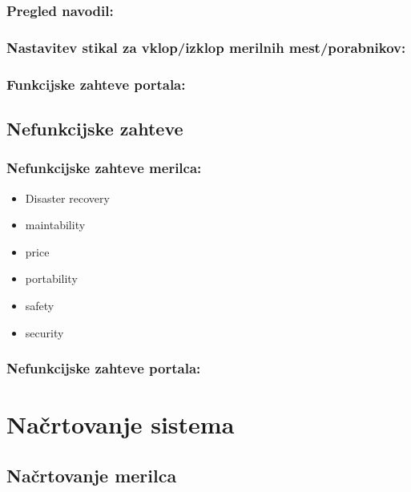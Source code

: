 \documentclass[12pt,a4paper,titlepage,openany]{report}
\begin{document}
\subsection{Pregled navodil:}

\subsection{Nastavitev stikal za vklop/izklop merilnih mest/porabnikov:}

\subsection{Funkcijske zahteve portala:}


\section{Nefunkcijske zahteve}
\thispagestyle{fancy}

\subsection{Nefunkcijske zahteve merilca:}

\begin{itemize}

\item Disaster recovery
\item maintability
\item price
\item portability
\item safety
\item security

\end{itemize}




\subsection{Nefunkcijske zahteve portala:}


\chapter{Načrtovanje sistema}
\thispagestyle{fancy}

\section{Načrtovanje merilca}
\thispagestyle{fancy}
\end{document}

